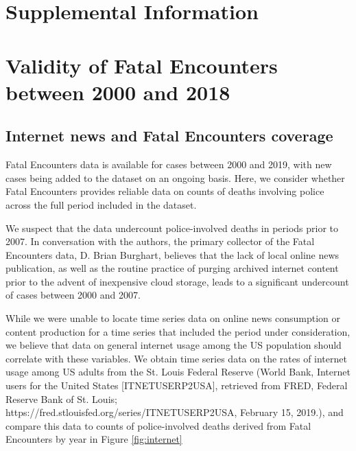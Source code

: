 \documentclass{article}
\begin{document}
\section*{Supplemental Information}

\section{Validity of Fatal Encounters between 2000 and 2018}

\subsection{Internet news and Fatal Encounters coverage}

Fatal Encounters data is available for cases between 2000 and 2019, with new cases being added to the dataset on an ongoing basis. Here, we consider whether Fatal Encounters provides reliable data on counts of deaths involving police across the full period included in the dataset. 

We suspect that the data undercount police-involved deaths in periods prior to 2007. In conversation with the authors, the primary collector of the Fatal Encounters data, D. Brian Burghart, believes that the lack of local online news publication, as well as the routine practice of purging archived internet content prior to the advent of inexpensive cloud storage, leads to a significant undercount of cases between 2000 and 2007.

While we were unable to locate time series data on online news consumption or content production for a time series that included the period under consideration, we believe that data on general internet usage among the US population should correlate with these variables. We obtain time series data on the rates of internet usage among US adults from the St. Louis Federal Reserve (World Bank, Internet users for the United States [ITNETUSERP2USA], retrieved from FRED, Federal Reserve Bank of St. Louis; https://fred.stlouisfed.org/series/ITNETUSERP2USA, February 15, 2019.), and compare this data to counts of police-involved deaths derived from Fatal Encounters by year in Figure \ref{fig:internet}
\end{document}
